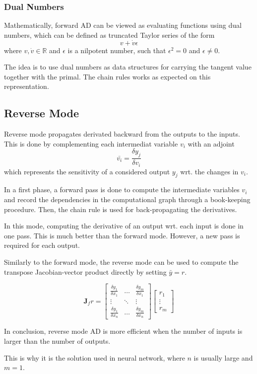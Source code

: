 \subsubsection{Dual Numbers}
Mathematically, forward AD can be viewed as evaluating functions using dual numbers, which can be defined as truncated Taylor series of the form
\begin{equation}
    v + \dot{v}\epsilon
\end{equation}
where $v, \dot{v} \in \mathbb{R}$ and $\epsilon$ is a nilpotent number, such that $\epsilon^2 = 0$ and $\epsilon \ne 0$.

The idea is to use dual numbers as data structures for carrying the tangent value together with the primal.
The chain rules works as expected on this representation.


\subsection{Reverse Mode}

Reverse mode propagates derivated backward from the outputs to the inputs. This is done by complementing each intermediat variable $v_i$ with an adjoint
\begin{equation}
    \bar{v_i} = \frac{\delta y_j}{\delta v_i}
\end{equation}
which represents the sensitivity of a considered output $y_j$ wrt. the changes in $v_i$.

In a first phase, a forward pass is done to compute the intermediate variables $v_i$ and record the dependencies in the computational graph through a book-keeping procedure.
Then, the chain rule is used for back-propagating the derivatives.


In this mode, computing the derivative of an output wrt. each input is done in one pass. This is much better than the forward mode. However, a new pass is required for each output.

Similarly to the forward mode, the reverse mode can be used to compute the transpose Jacobian-vector product directly by setting $\bar{y} = r$.

\begin{equation}
    \mathbf{J}_f r = \left[\begin{array}{ccc}
        \frac{\delta y_1}{\delta x_1} & \hdots & \frac{\delta y_m}{\delta x_1}  \\
        \vdots & \ddots & \vdots \\
        \frac{\delta y_1}{\delta x_n} & \hdots & \frac{\delta y_m}{\delta x_n}
    \end{array}\right]
    \left[\begin{array}{c}
        r_1 \\
        \vdots \\
        r_m
    \end{array}\right]
\end{equation}



In conclusion, reverse mode AD is more efficient when the number of inputs is larger than the number of outputs.

This is why it is the solution used in neural network, where $n$ is usually large and $m=1$.